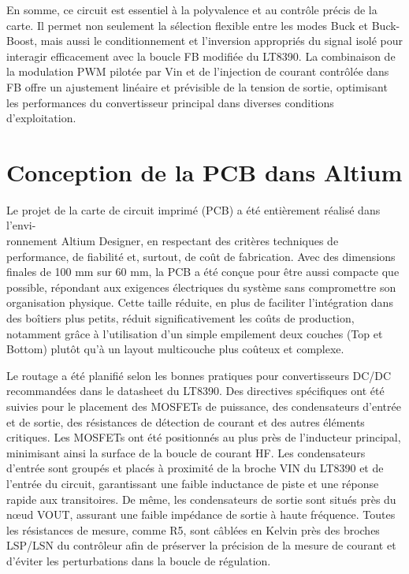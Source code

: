 En somme, ce circuit est essentiel à la polyvalence et au contrôle précis de la carte. Il permet non seulement la sélection flexible entre les modes Buck et Buck-Boost, mais aussi le conditionnement et l'inversion appropriés du signal isolé pour interagir efficacement avec la boucle FB modifiée du LT8390. La combinaison de la modulation PWM pilotée par Vin et de l'injection de courant contrôlée dans FB offre un ajustement linéaire et prévisible de la tension de sortie, optimisant les performances du convertisseur principal dans diverses conditions d'exploitation.





\section{Conception de la PCB dans Altium}

Le projet de la carte de circuit imprimé (PCB) a été entièrement réalisé dans l'envi-\\ ronnement Altium Designer, en respectant des critères techniques de performance, de fiabilité et, surtout, de coût de fabrication. Avec des dimensions finales de 100 mm sur 60 mm, la PCB a été conçue pour être aussi compacte que possible, répondant aux exigences électriques du système sans compromettre son organisation physique. Cette taille réduite, en plus de faciliter l'intégration dans des boîtiers plus petits, réduit significativement les coûts de production, notamment grâce à l'utilisation d'un simple empilement deux couches (Top et Bottom) plutôt qu'à un layout multicouche plus coûteux et complexe.

Le routage a été planifié selon les bonnes pratiques pour convertisseurs DC/DC recommandées dans le datasheet du LT8390. Des directives spécifiques ont été suivies pour le placement des MOSFETs de puissance, des condensateurs d'entrée et de sortie, des résistances de détection de courant et des autres éléments critiques. Les MOSFETs ont été positionnés au plus près de l'inducteur principal, minimisant ainsi la surface de la boucle de courant HF. Les condensateurs d'entrée sont groupés et placés à proximité de la broche VIN du LT8390 et de l'entrée du circuit, garantissant une faible inductance de piste et une réponse rapide aux transitoires. De même, les condensateurs de sortie sont situés près du nœud VOUT, assurant une faible impédance de sortie à haute fréquence. Toutes les résistances de mesure, comme R5, sont câblées en Kelvin près des broches LSP/LSN du contrôleur afin de préserver la précision de la mesure de courant et d'éviter les perturbations dans la boucle de régulation.

